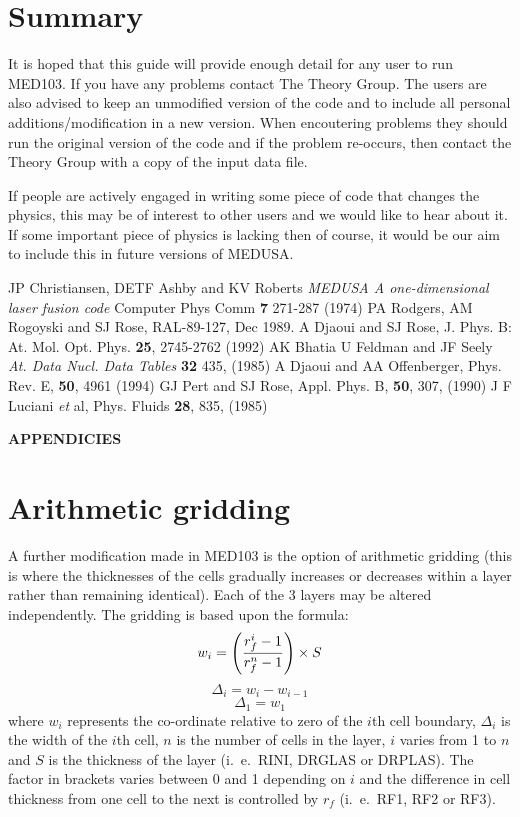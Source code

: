 \section{Summary}
It is hoped that this guide will provide enough detail for any
user to run MED103. If you have any problems contact The Theory Group.
The users are also advised to
keep an unmodified version of the code and to include all personal additions/modification in a new version.
When encoutering problems they should run the original version of the code and if the problem re-occurs,
then contact the Theory Group with a copy of the input data file.

If people are actively engaged in writing some piece of code that changes
the physics, 
this may be of interest to other users and we would like to hear about it. If some important
piece of physics is lacking
then of course, it would be our aim to include this in future versions of
MEDUSA. 
 
\begin{thebibliography}{9}
JP Christiansen, DETF Ashby and KV Roberts
{\sl MEDUSA A one-dimensional laser fusion code}
Computer Phys Comm {\bf 7} 271-287 (1974)
 PA Rodgers, AM Rogoyski and SJ Rose, RAL-89-127, Dec 1989.
A Djaoui and SJ Rose, J. Phys. B: At. Mol. Opt. Phys.
{\bf 25}, 2745-2762 (1992)
AK Bhatia U Feldman  and JF Seely 
{\it At. Data Nucl. Data
Tables} {\bf 32} 435, (1985)
A Djaoui and AA Offenberger, Phys. Rev. E, {\bf 50},
4961 (1994)
GJ Pert and SJ Rose, Appl. Phys. B, {\bf 50}, 307, (1990)
J F Luciani {\it et} al, Phys. Fluids {\bf 28}, 835, (1985)
\end{thebibliography}
\newpage
\begin{center}
{\LARGE\bf APPENDICIES}
\end{center}
\appendix
\section{Arithmetic gridding}
A further modification made in MED103 is the option of arithmetic
gridding (this is where the thicknesses of the cells gradually
increases or decreases within a layer rather than remaining identical).
Each of the 3 layers may be altered independently. The
gridding is based upon the formula:
$$w_i = \left( {r_f^i -1 \over r_f^n -1} \right) \times S $$
$$ \Delta_i = w_i - w_{i-1}$$
$$ \Delta_1 = w_1$$
where $w_i$ represents the co-ordinate relative to zero of the
$i$th cell boundary,
$\Delta_i$ is the width of the $i$th cell,
$n$ is the number of cells in the layer, $i$ varies from 1 to
$n$ and $S$ is the thickness of the layer (i.\ e.\ RINI, DRGLAS
or DRPLAS).
The factor in brackets varies between 0 and 1 depending on $i$ and
the difference in cell thickness from one cell to the next is controlled
by $r_f$ (i.\ e.\ RF1, RF2 or RF3).
 
